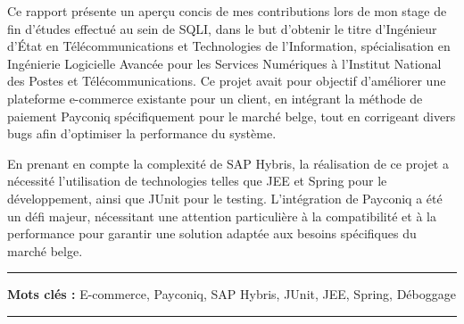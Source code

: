 Ce rapport présente un aperçu concis de mes contributions lors de mon stage de fin d'études effectué au sein de SQLI, dans le but d'obtenir le titre d'Ingénieur d'État en Télécommunications et Technologies de l'Information, spécialisation en Ingénierie Logicielle Avancée pour les Services Numériques à l'Institut National des Postes et Télécommunications. Ce projet avait pour objectif d'améliorer une plateforme e-commerce existante pour un client, en intégrant la méthode de paiement Payconiq spécifiquement pour le marché belge, tout en corrigeant divers bugs afin d'optimiser la performance du système.\\
\vspace{10pt}

En prenant en compte la complexité de SAP Hybris, la réalisation de ce projet a nécessité l'utilisation de technologies telles que JEE et Spring pour le développement, ainsi que JUnit pour le testing. L'intégration de Payconiq a été un défi majeur, nécessitant une attention particulière à la compatibilité et à la performance pour garantir une solution adaptée aux besoins spécifiques du marché belge.
\vspace{10pt}

\noindent\rule[2pt]{\textwidth}{0.5pt}

{\textbf{Mots clés :}}
E-commerce, Payconiq, SAP Hybris, JUnit, JEE, Spring, Déboggage
\\
\noindent\rule[2pt]{\textwidth}{0.5pt}